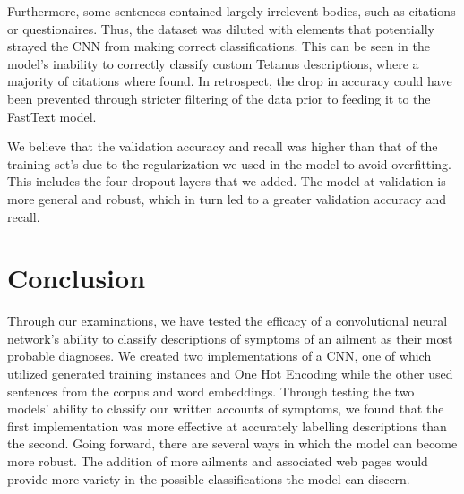 \documentclass[12pt]{report}
\begin{document}
Furthermore, some sentences contained largely irrelevent bodies, such as
citations or questionaires. Thus, the dataset was diluted with elements that
potentially strayed the CNN from making correct classifications. This can be
seen in the model's inability to correctly classify custom Tetanus descriptions,
where a majority of citations where found. In retrospect, the drop
in accuracy could have been prevented through stricter filtering of the data
prior to feeding it to the FastText model.

We believe that the validation accuracy and recall was higher than that of the training set's
due to the regularization we used in the model to avoid overfitting.
This includes the four dropout layers that we added. The model
at validation is more general and robust, which in turn led to a greater
validation accuracy and recall.

\chapter{Conclusion}

Through our examinations, we have tested the efficacy of a convolutional neural
network's ability to classify descriptions of symptoms of an ailment as their
most probable diagnoses. We created two implementations of a CNN,
one of which utilized generated training instances and One Hot Encoding while
the other used sentences from the corpus and word embeddings. Through testing
the two models' ability to classify our written accounts of symptoms, we found
that the first implementation was more effective at accurately labelling
descriptions than the second. Going forward, there are several ways in which the
model can become more robust. The addition of more ailments and associated web
pages would provide more variety in the possible classifications the model can
discern.


\end{document}
